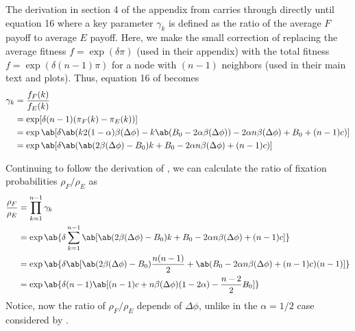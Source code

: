 The derivation in section 4 of the appendix
from \tripp{}
carries through directly until equation 16
where a key parameter $\gamma_k$ is defined
as the ratio of the average $F$ payoff to average $E$ payoff.
Here, we make the small correction of replacing
the average fitness $f = \exp(\delta \pi)$ (used in their appendix)
with the total fitness $f = \exp(\delta (n-1) \pi)$
for a node with $(n-1)$ neighbors
(used in their main text and plots).
Thus, equation 16 of \tripp{} becomes
\begin{align*}
  \gamma_k &= \frac{f_F(k)}{f_E(k)} \\
           &= \exp[\delta (n-1) (\pi_F(k) - \pi_E(k))]
           \\
           &= \exp\ab[\delta \ab(
    k 2 (1-\alpha) \beta(\Delta\phi)
    - k \ab(B_0 - 2 \alpha \beta(\Delta\phi))
                 - 2 \alpha n \beta(\Delta\phi) + B_0 + (n-1) c)] \\
      &= \exp\ab[\delta \ab(
    \ab(2 \beta(\Delta\phi) - B_0) k
                 + B_0 - 2 \alpha n \beta(\Delta\phi) + (n-1) c)]
\end{align*}

Continuing to follow the derivation of \tripp{},
we can calculate the ratio of fixation probabilities $\rho_F/\rho_E$ as
\begin{equation}
  \begin{aligned}
    \frac{\rho_F}{\rho_E} &= \prod_{k=1}^{n-1} \gamma_k \\
           &= \exp \ab\{
                \delta
                \sum_{k=1}^{n-1}
                \ab[
    \ab(2 \beta(\Delta\phi) - B_0) k
                 + B_0 - 2 \alpha n \beta(\Delta\phi) + (n-1) c
                 ]
                 \} \\
           &= \exp \ab\{
                \delta
                \ab[
                \ab(2 \beta(\Delta\phi) - B_0) \frac{n(n-1)}{2}
                 + \ab(B_0 - 2 \alpha n \beta(\Delta\phi) + (n-1) c) (n-1)
                 ]
                 \} \\
           &= \exp \ab\{
                \delta (n-1)
                \ab[
                (n-1) c + n \beta(\Delta\phi) (1 - 2 \alpha)
                - \frac{n-2}{2} B_0
                 ]
                 \}
  \end{aligned}
  \label{eq:fixation_prob_ratio}
\end{equation}
Notice, now the ratio of $\rho_F/\rho_E$ depends of $\Delta \phi$,
unlike in the $\alpha=1/2$ case considered by \tripp{}.

